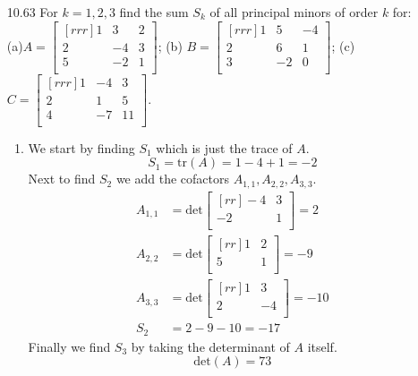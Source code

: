 \documentclass[12pt]{article}
\theoremstyle{definition}
\theoremstyle{plain}
\begin{document}
\begin{enumerate}
\item[10.63]For $k=1,2,3$ find the sum $S_k$ of all principal minors of order $k$ for:\\
(a)$A=\begin{bmatrix}[rrr]1&3&2\\2&-4&3\\5&-2&1\\\end{bmatrix}$; (b) $B=\begin{bmatrix}[rrr]1&5&-4\\2&6&1\\3&-2&0\\\end{bmatrix}$; (c) $C=\begin{bmatrix}[rrr]1&-4&3\\2&1&5\\4&-7&11\\\end{bmatrix}$.
	\begin{enumerate}
	\item We start by finding $S_1$ which is just the trace of $A$.
	\[ S_1 = \mathrm{tr}(A)=1-4+1=-2 \]
	Next to find $S_2$ we add the cofactors $A_{1,1}, A_{2,2}, A_{3,3}$. 
	\begin{align*}
	A_{1,1}&=\mathrm{det}\begin{bmatrix}[rr]-4&3\\-2&1\\\end{bmatrix} = 2\\
	A_{2,2}&=\mathrm{det}\begin{bmatrix}[rr]1&2\\5&1\\\end{bmatrix} = -9\\
	A_{3,3}&=\mathrm{det}\begin{bmatrix}[rr]1&3\\2&-4\\\end{bmatrix} = -10\\
	S_2 &= 2-9-10 = -17
	\end{align*}
	Finally we find $S_3$ by taking the determinant of $A$ itself.
	\[ \mathrm{det}(A)= 73 \]
	\end{enumerate}		
	

\end{enumerate}
\end{document}
